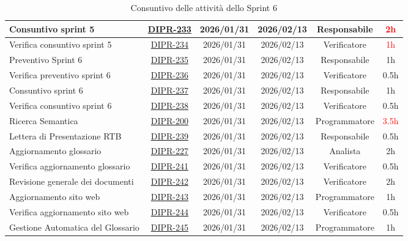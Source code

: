 \documentclass[a4paper,12pt]{article}
\begin{document}
\begin{table}[H]
\begin{adjustwidth}{-4cm}{-4cm}
\begin{spacing}{1}
\begin{tabular}{|p{4cm}|c|c|c|c|c|}
        \hline
        Consuntivo sprint 5 & \href{https://7zpus.atlassian.net/browse/DIPR-233}{DIPR-233} & 2026/01/31 & 2026/02/13 & Responsabile & \textcolor{red}{2h} \\
        \hline
        Verifica consuntivo sprint 5 & \href{https://7zpus.atlassian.net/browse/DIPR-234}{DIPR-234} & 2026/01/31 & 2026/02/13 & Verificatore & \textcolor{red}{1h} \\
        \hline
        Preventivo Sprint 6 & \href{https://7zpus.atlassian.net/browse/DIPR-235}{DIPR-235} & 2026/01/31 & 2026/02/13 & Responsabile & 1h \\
        \hline
        Verifica preventivo sprint 6 & \href{https://7zpus.atlassian.net/browse/DIPR-236}{DIPR-236} & 2026/01/31 & 2026/02/13 & Verificatore & 0.5h \\
        \hline
        Consuntivo sprint 6 & \href{https://7zpus.atlassian.net/browse/DIPR-237}{DIPR-237} & 2026/01/31 & 2026/02/13 & Responsabile & 1h \\
        \hline
        Verifica consuntivo sprint 6 & \href{https://7zpus.atlassian.net/browse/DIPR-238}{DIPR-238} & 2026/01/31 & 2026/02/13 & Verificatore & 0.5h \\
        \hline
        Ricerca Semantica & \href{https://7zpus.atlassian.net/browse/DIPR-200}{DIPR-200} & 2026/01/31 & 2026/02/13 & Programmatore & \textcolor{red}{3.5h} \\
        \hline
        Lettera di Presentazione RTB & \href{https://7zpus.atlassian.net/browse/DIPR-239}{DIPR-239} & 2026/01/31 & 2026/02/13 & Responsabile & 0.5h \\
        \hline
        Aggiornamento glossario & \href{https://7zpus.atlassian.net/browse/DIPR-227}{DIPR-227} & 2026/01/31 & 2026/02/13 & Analista & 2h \\
        \hline
        Verifica aggiornamento glossario & \href{https://7zpus.atlassian.net/browse/DIPR-241}{DIPR-241} & 2026/01/31 & 2026/02/13 & Verificatore & 0.5h \\
        \hline
        Revisione generale dei documenti & \href{https://7zpus.atlassian.net/browse/DIPR-242}{DIPR-242} & 2026/01/31 & 2026/02/13 & Verificatore & 2h \\
        \hline
        Aggiornamento sito web & \href{https://7zpus.atlassian.net/browse/DIPR-243}{DIPR-243} & 2026/01/31 & 2026/02/13 & Programmatore & 1h \\
        \hline
        Verifica aggiornamento sito web & \href{https://7zpus.atlassian.net/browse/DIPR-244}{DIPR-244} & 2026/01/31 & 2026/02/13 & Verificatore & 0.5h \\
        \hline
        Gestione Automatica del Glossario & \href{https://7zpus.atlassian.net/browse/DIPR-245}{DIPR-245} & 2026/01/31 & 2026/02/13 & Programmatore & 1h \\
        \hline
    \end{tabular}
    \end{spacing}
    \caption{Consuntivo delle attività dello Sprint 6}
    \end{adjustwidth}
\end{table}
\end{document}
